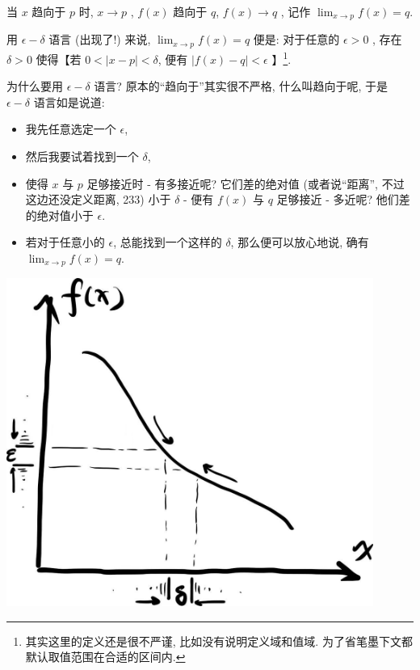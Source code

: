 \begin{tcolorbox}[size=fbox, breakable, enhanced jigsaw, title={极限 (limit)}]

\begin{tcolorbox}[size=fbox, breakable, enhanced jigsaw, title={定义}]
当 $x$ 趋向于 $p$ 时, $x\rightarrow p$ , $f(x)$
趋向于 $q$, $f(x)\rightarrow q$ , 记作
$\lim_{x\rightarrow p}f(x)=q.$

用 $\epsilon - \delta$ 语言 (出现了!) 来说,
$\lim_{x\rightarrow p}f(x)=q$ 便是: 对于任意的 $\epsilon>0$ , 存在
$\delta>0$ 使得【若 $0<|x-p|<\delta$, 便有 $|f(x)-q|<\epsilon$
】\footnote{其实这里的定义还是很不严谨, 比如没有说明定义域和值域.
  为了省笔墨下文都默认取值范围在合适的区间内.}.

\end{tcolorbox}

为什么要用 $\epsilon - \delta$ 语言? 原本的``趋向于''其实很不严格,
什么叫趋向于呢, 于是 $\epsilon - \delta$ 语言如是说道:

\begin{itemize}

\item
  我先任意选定一个 $\epsilon$,
\item
  然后我要试着找到一个 $\delta$,
\item
  使得 $x$ 与 $p$ 足够接近时 - 有多接近呢? 它们差的绝对值
  (或者说``距离'', 不过这边还没定义距离, 233) 小于 $\delta$ - 便有
  $f(x)$ 与 $q$ 足够接近 - 多近呢? 他们差的绝对值小于 $\epsilon$.
\item
  若对于任意小的 $\epsilon$, 总能找到一个这样的 $\delta$,
  那么便可以放心地说, 确有$\lim_{x\rightarrow p}f(x)=q$.
\end{itemize}

\begin{tcolorbox}[size=fbox, breakable, enhanced jigsaw]
  \includegraphics[width=0.9\textwidth]{img/image-20230503152041842.png}
\end{tcolorbox}


\end{tcolorbox}
